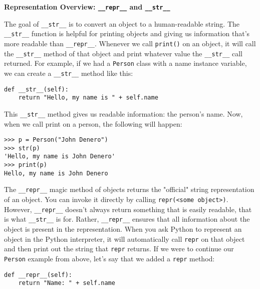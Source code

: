 \textbf{Representation Overview: \lstinline{__repr__} and \lstinline{__str__}}

The goal of \lstinline{__str__} is to convert an object to a human-readable string. The \lstinline{__str__} function is helpful for printing objects and giving us information that's more readable than \lstinline{__repr__}. Whenever we call \lstinline{print()} on an object, it will call the \lstinline{__str__} method of that object and print whatever value the \lstinline{__str__} call returned. For example, if we had a \lstinline{Person} class with a name instance variable, we can create a \lstinline{__str__} method like this:
\vspace{.25cm}
\begin{lstlisting}
def __str__(self):
    return "Hello, my name is " + self.name
\end{lstlisting}
\vspace{.25cm}

This \lstinline{__str__} method gives us readable information: the person's name. Now, when we call print on a person, the following will happen:
\vspace{.25cm}
\begin{lstlisting}
>>> p = Person("John Denero")
>>> str(p)
'Hello, my name is John Denero'
>>> print(p)
Hello, my name is John Denero
\end{lstlisting}
\vspace{.25cm}

The \lstinline{__repr__} magic method of objects returns the "official" string representation of an object. You can invoke it directly by calling \lstinline{repr(<some object>)}. However, \lstinline{__repr__} doesn't always return something that is easily readable, that is what \lstinline{__str__} is for. Rather, \lstinline{__repr__} ensures that all information about the object is present in the representation. When you ask Python to represent an object in the Python interpreter, it will automatically call \lstinline{repr} on that object and then print out the string that \lstinline{repr} returns. If we were to continue our \lstinline{Person} example from above, let's say that we added a \lstinline{repr} method:
\vspace{.25cm}
\begin{lstlisting}
def __repr__(self):
    return "Name: " + self.name
\end{lstlisting}
\vspace{.25cm}

